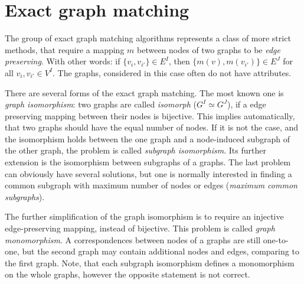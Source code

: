 \section{Exact graph matching}
The group of exact graph matching algorithms represents a class of more strict methods, that require a mapping $m$ between nodes of two graphs to be \emph{edge preserving}. With other words: if $\{v_i,v_{i'}\}\in E^I$, then $\{m(v),m(v_{i'})\}\in E^J$ for all $v_i,v_{i'}\in V^I$. The graphs, considered in this case often do not have attributes.

There are several forms of the exact graph matching. The most known one is \emph{graph isomorphism}: two graphs are called \emph{isomorph} ($G^I\simeq G^J$), if a edge preserving mapping between their nodes is bijective. This implies automatically, that two graphs should have the equal number of nodes. If it is not the case, and the isomorphism holds between the one graph and a node-induced subgraph of the other graph, the problem is called \emph{subgraph isomorphism}. Its further extension is the isomorphism between subgraphs of a graphs. The last problem can obviously have several solutions, but one is normally interested in finding a common subgraph with maximum number of nodes or edges (\emph{maximum common subgraphs}).  

The further simplification of the graph isomorphism is to require an injective edge-preserving mapping, instead of bijective. This problem is called \emph{graph monomorphism}. A correspondences between nodes of a graphs are still one-to-one, but the second graph may contain additional nodes and edges, comparing to the first graph. Note, that each subgraph isomorphism defines a monomorphism on the whole graphs, however the opposite statement is not correct.

